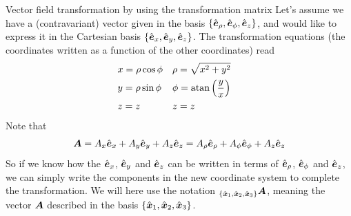 \documentclass[a4paper, 12pt]{article}
\begin{document}
\begin{example}{Vector field transformation by using the transformation matrix}
 \label{ex:vft}
 Let's assume we have a (contravariant) vector given in the basis
$\{\hat{\boldsymbol{e}}_\rho,
 \hat{\boldsymbol{e}}_\phi, \hat{\boldsymbol{e}}_z\}$, and would like to express it in the Cartesian basis
 $\{\hat{\boldsymbol{e}}_x, \hat{\boldsymbol{e}}_y, \hat{\boldsymbol{e}}_z\}$. The transformation equations (the
coordinates
 written as a function of the other coordinates) read
 \begin{align*}
  &x = \rho \cos\phi&
  &\rho = \sqrt{x^2+y^2}&
  \\
  &y = \rho \sin\phi&
  &\phi = \text{atan}\left(\frac{y}{x}\right)&
  \\
  &z=z&
  &z=z&
 \end{align*}
 Note that
 \begin{align}
  \boldsymbol{A} =
  A_x \hat{\boldsymbol{e}}_x + A_y \hat{\boldsymbol{e}}_y + A_z \hat{\boldsymbol{e}}_z =
  A_\rho \hat{\boldsymbol{e}}_\rho + A_\phi \hat{\boldsymbol{e}}_\phi + A_z  \hat{\boldsymbol{e}}_z
  \label{eq:component}
 \end{align}
 So if we know how the $\hat{\boldsymbol{e}}_x$, $\hat{\boldsymbol{e}}_y$ and $\hat{\boldsymbol{e}}_z$ can be written in
terms
 of $\hat{\boldsymbol{e}}_\rho$, $\hat{\boldsymbol{e}}_\phi$ and $\hat{\boldsymbol{e}}_z$, we can simply write the
components
 in the new coordinate system to complete the transformation. We will here use
 the notation $_{\{\hat{\boldsymbol{x}}_1, \hat{\boldsymbol{x}}_2, \hat{\boldsymbol{x}}_3\}} \boldsymbol{A}$, meaning the vector
 $\boldsymbol{A}$ described in the basis ${\{\hat{\boldsymbol{x}}_1, \hat{\boldsymbol{x}}_2, \hat{\boldsymbol{x}}_3\}}$.


\end{example}
\end{document}
